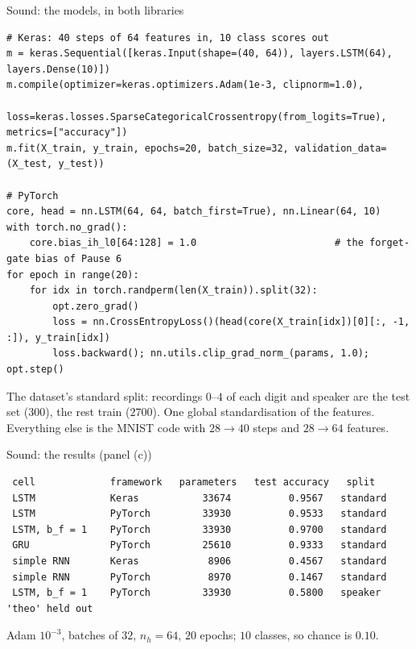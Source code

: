 \documentclass[10pt,aspectratio=169]{beamer}
\begin{document}
\begin{frame}[fragile]{Sound: the models, in both libraries}
\begin{lstlisting}
# Keras: 40 steps of 64 features in, 10 class scores out
m = keras.Sequential([keras.Input(shape=(40, 64)), layers.LSTM(64), layers.Dense(10)])
m.compile(optimizer=keras.optimizers.Adam(1e-3, clipnorm=1.0),
          loss=keras.losses.SparseCategoricalCrossentropy(from_logits=True), metrics=["accuracy"])
m.fit(X_train, y_train, epochs=20, batch_size=32, validation_data=(X_test, y_test))

# PyTorch
core, head = nn.LSTM(64, 64, batch_first=True), nn.Linear(64, 10)
with torch.no_grad():
    core.bias_ih_l0[64:128] = 1.0                        # the forget-gate bias of Pause 6
for epoch in range(20):
    for idx in torch.randperm(len(X_train)).split(32):
        opt.zero_grad()
        loss = nn.CrossEntropyLoss()(head(core(X_train[idx])[0][:, -1, :]), y_train[idx])
        loss.backward(); nn.utils.clip_grad_norm_(params, 1.0); opt.step()
\end{lstlisting}
\small
The dataset's standard split: recordings $0$--$4$ of each digit and speaker
are the test set ($300$), the rest train ($2700$).  One global
standardisation of the features.  Everything else is the MNIST code with
$28\to40$ steps and $28\to64$ features.
\end{frame}

\begin{frame}[fragile]{Sound: the results (panel (c))}
\begin{lstlisting}
 cell             framework   parameters   test accuracy   split
 LSTM             Keras           33674          0.9567   standard
 LSTM             PyTorch         33930          0.9533   standard
 LSTM, b_f = 1    PyTorch         33930          0.9700   standard
 GRU              PyTorch         25610          0.9333   standard
 simple RNN       Keras            8906          0.4567   standard
 simple RNN       PyTorch          8970          0.1467   standard
 LSTM, b_f = 1    PyTorch         33930          0.5800   speaker 'theo' held out
\end{lstlisting}
\small Adam $10^{-3}$, batches of $32$, $n_h=64$, $20$ epochs; $10$ classes,
so chance is $0.10$.
\end{frame}
\end{document}
